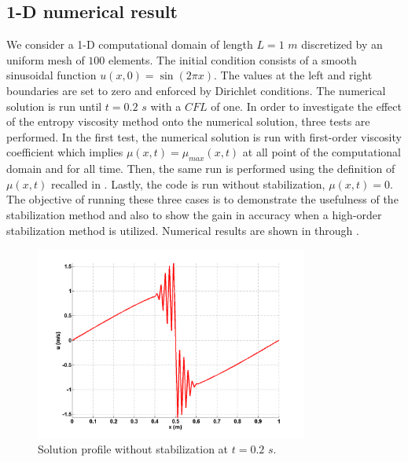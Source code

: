 \subsection{1-D numerical result}\label{sec:1dnum_sct2b}
We consider a 1-D computational domain of length $L=1$ $m$ discretized by an uniform mesh of $100$ elements. The initial condition consists of a smooth sinusoidal function $u(x,0) = \sin \left( 2 \pi x \right)$. The values at the left and right boundaries are set to zero and enforced by Dirichlet conditions. The numerical solution is run until $t=0.2$ $s$ with a $CFL$ of one. In order to investigate the effect of the entropy viscosity method onto the numerical solution, three tests are performed. In the first test, the numerical solution is run with first-order viscosity coefficient which implies $\mu(x,t) = \mu_{max}(x,t)$ at all point of the computational domain and for all time. Then, the same run is performed using the definition of $\mu(x,t)$ recalled in . Lastly, the code is run without stabilization, $\mu(x,t) = 0$. The objective of running these three cases is to demonstrate the usefulness of the stabilization method and also to show the gain in accuracy when a high-order stabilization method is utilized. Numerical results are shown in  through . 
%
\begin{figure}[H]
        \centering
        \includegraphics[width=0.8\textwidth]{figures/1D_sol_free.png}
        \caption{Solution profile without stabilization at $t=0.2$ $s$.}
        \label{fig:1d_burger_free}
\end{figure}
%
